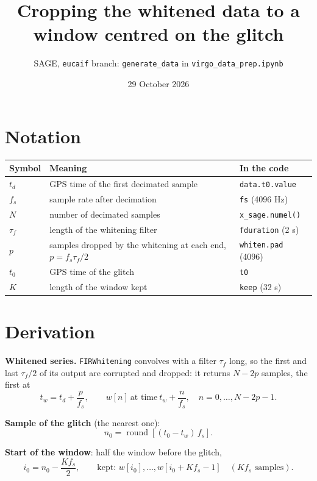 \documentclass[11pt,a4paper]{article}
\title{Cropping the whitened data to a window centred on the glitch}
\author{SAGE, \texttt{eucaif} branch: \texttt{generate\_data} in \texttt{virgo\_data\_prep.ipynb}}
\date{29 October 2026}
\begin{document}
\maketitle

\section*{Notation}

\begin{center}
\begin{tabular}{@{}lll@{}}
\toprule
Symbol & Meaning & In the code \\
\midrule
$t_d$ & GPS time of the first decimated sample & \texttt{data.t0.value} \\
$f_s$ & sample rate after decimation & \texttt{fs} (4096 Hz) \\
$N$ & number of decimated samples & \texttt{x\_sage.numel()} \\
$\tau_f$ & length of the whitening filter & \texttt{fduration} (2 s) \\
$p$ & samples dropped by the whitening at each end, $p = f_s \tau_f / 2$ & \texttt{whiten.pad} (4096) \\
$t_0$ & GPS time of the glitch & \texttt{t0} \\
$K$ & length of the window kept & \texttt{keep} (32 s) \\
\bottomrule
\end{tabular}
\end{center}

\section*{Derivation}

\textbf{Whitened series.} \texttt{FIRWhitening} convolves with a filter $\tau_f$ long, so the first and last
$\tau_f/2$ of its output are corrupted and dropped: it returns $N - 2p$ samples, the first at
\begin{equation}
  t_w = t_d + \frac{p}{f_s}, \qquad
  w[n] \ \text{at time}\ t_w + \frac{n}{f_s}, \quad n = 0, \dots, N - 2p - 1 .
\end{equation}

\textbf{Sample of the glitch} (the nearest one):
\begin{equation}
  n_0 = \operatorname{round}\!\left[ (t_0 - t_w)\, f_s \right].
\end{equation}

\textbf{Start of the window}: half the window before the glitch,
\begin{equation}
  i_0 = n_0 - \frac{K f_s}{2},
  \qquad \text{kept: } w[i_0], \dots, w[i_0 + K f_s - 1] \quad (K f_s \text{ samples}).
\end{equation}
\end{document}

